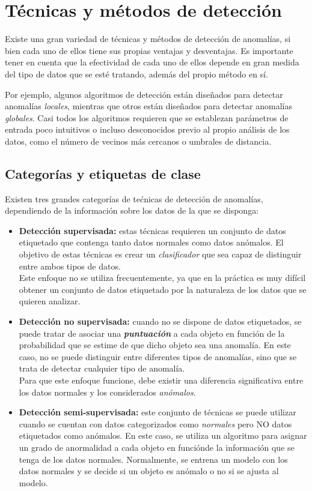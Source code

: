 \chapter{Técnicas y métodos de detección}\label{chap:tecnicas}
Existe una gran variedad de técnicas y métodos de detección de anomalías, si bien cada uno
de ellos tiene sus propias ventajas y desventajas. Es importante tener en cuenta que la
efectividad de cada uno de ellos depende en gran medida del tipo de datos que se esté
tratando, además del propio método en sí.

Por ejemplo, algunos algoritmos de detección están diseñados para detectar anomalías \textit{locales},
mientras que otros están diseñados para detectar anomalías \textit{globales}. Casi todos los algoritmos
requieren que se establezan parámetros de entrada poco intuitivos o incluso desconocidos previo
al propio análisis de los datos, como el número de vecinos más cercanos o umbrales de distancia.

\section{Categorías y etiquetas de clase}
Existen tres grandes categorías de tećnicas de detección de anomalías, dependiendo de la información
sobre los datos de la que se disponga:

\begin{itemize}[topsep=0pt]
	\item \textbf{Detección supervisada:} estas técnicas requieren un conjunto de datos etiquetado
		que contenga tanto datos normales como datos anómalos. El objetivo de estas técnicas es
		crear un \textit{clasificador} que sea capaz de distinguir entre ambos tipos de datos. \\
		Este enfoque no se utiliza frecuentemente, ya que en la práctica es muy difícil obtener
		un conjunto de datos etiquetado por la naturaleza de los datos que se quieren analizar.
	\item \textbf{Detección no supervisada:} cuando no se dispone de datos etiquetados, se puede
		tratar de asociar una \textit{\textbf{puntuación}} a cada objeto en función de la probabilidad que
		se estime de que dicho objeto sea una anomalía. En este caso, no se puede distinguir entre
		diferentes tipos de anomalías, sino que se trata de detectar cualquier tipo de anomalía. \\
		Para que este enfoque funcione, debe existir una diferencia significativa entre los datos
		normales y los considerados \textit{anómalos}.
	\item \textbf{Detección semi-supervisada:} este conjunto de técnicas se puede utilizar cuando se
		cuentan con datos categorizados como \textit{normales} pero NO datos etiquetados como anómalos.
		En este caso, se utiliza un algoritmo para asignar un grado de anormalidad a cada objeto en
		funciónde la información que se tenga de los datos normales. Normalmente, se entrena un
		modelo con los datos normales y se decide si un objeto es anómalo o no si se ajusta al modelo.
\end{itemize}

